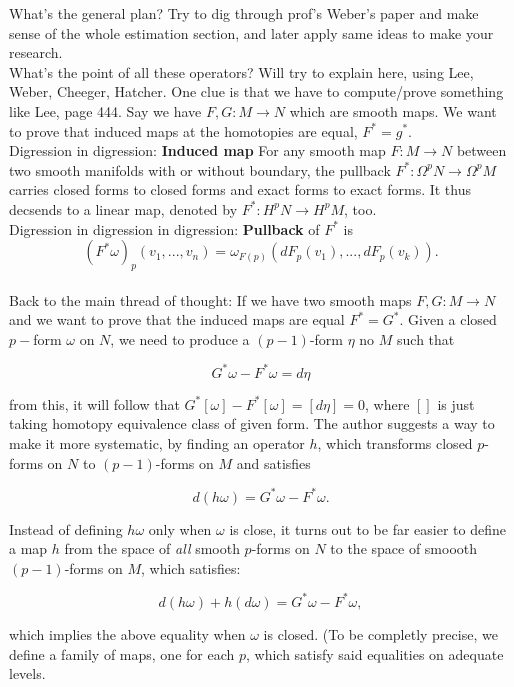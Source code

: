 \documentclass[licencjacka]{pracamgr}
\begin{document}
What's the general plan? Try to dig through prof's Weber's paper and
make sense of the whole estimation section, and later apply same ideas
to make your research. \\

What's the point of all these operators? Will try to
explain here, using Lee, Weber, Cheeger, Hatcher.  One clue is that we
have to compute/prove something like Lee, page 444.  Say we have $F,G:
M \rightarrow N$ which are smooth maps. We want to prove that induced
maps at the homotopies are equal, $F^\ast = g^\ast$. \\

Digression in digression: \textbf{Induced map} For any smooth map $F:
M \rightarrow N$ between two smooth manifolds with or without
boundary, the pullback $F^\ast: \Omega^p N \rightarrow \Omega^p M$
carries closed forms to closed forms and exact forms to exact
forms. It thus decsends to a linear map, denoted by $F^\ast: H^p N
\rightarrow H^p M$, too. \\

Digression in digression in digression: \textbf{Pullback} of $F^\ast$ is
\[
    (F^\ast \omega)_p(v_1, ..., v_n) =
        \omega_{F(p)}(dF_p(v_1), ..., dF_p(v_k)).
\] \\

Back to the main thread of thought: If we have two smooth maps $F, G:
M \rightarrow N$ and we want to prove that the induced maps are equal
$F^\ast = G^\ast$. Given a closed $p-$form $\omega$ on $N$, we need to
produce a $(p-1)$-form $\eta$ no $M$ such that

\[
    G^\ast \omega - F^\ast \omega = d\eta
\]

from this, it will follow that $ G^\ast [\omega] - F^\ast [\omega] =
[d\eta] = 0$, where $[]$ is just taking homotopy equivalence class
of given form. The author suggests a way to make it more systematic,
by finding an operator $h$, which transforms closed $p$-forms on $N$
to $(p-1)$-forms on $M$ and satisfies

\[
    d(h\omega) = G^\ast \omega - F^\ast \omega.
\]

Instead of defining $h\omega$ only when $\omega$ is close, it turns
out to be far easier to define a map $h$ from the space of
\textit{all} smooth $p$-forms on $N$ to the space of smoooth
$(p-1)$-forms on $M$, which satisfies:

\[
    d(h\omega) + h(d\omega) = G^\ast \omega - F^\ast \omega ,
\]

which implies the above equality when $\omega$ is closed. (To be
completly precise, we define a family of maps, one for each $p$, which
satisfy said equalities on adequate levels.
\end{document}
